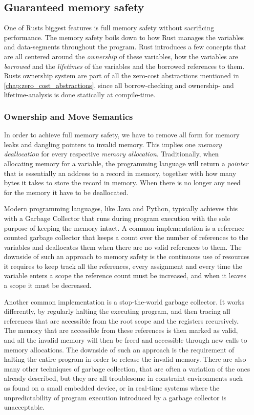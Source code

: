 \subsection{Guaranteed memory safety}

One of Rusts biggest features is full memory safety \cite{web:rust_book_unsafe} without sacrificing
performance. The memory safety boils down to how Rust manages the variables and data-segments
throughout the program. Rust introduces a few concepts that are all centered around the
\emph{ownership} of these variables, how the variables are \emph{borrowed} and the
\emph{lifetimes} of the variables and the borrowed references to them. Rusts ownership system are
part of all the zero-cost abstractions mentioned in \autoref{chap:zero_cost_abstractions}, since all
borrow-checking and ownership- and lifetime-analysis is done statically at compile-time.

\subsubsection{Ownership and Move Semantics} \hfill

In order to achieve full memory safety, we have to remove all form for memory leaks and dangling
pointers to invalid memory. This implies one \emph{memory deallocation} for every respective
\emph{memory allocation}. Traditionally, when allocating memory for a variable, the programming
language will return a \emph{pointer} that is essentially an address to a record in memory,
together with how many bytes it takes to store the record in memory. When there is no longer any
need for the memory it have to be deallocated.

Modern programming languages, like Java and Python, typically achieves this with a Garbage Collector
that runs during program execution with the sole purpose of keeping the memory intact. A common
implementation is a reference counted garbage collector that keeps a count over the number of
references to the variables and deallocates them when there are no valid references to them. The
downside of such an approach to memory safety is the continuous use of resources it requires to keep
track all the references, every assignment and every time the variable enters a scope the reference
count must be increased, and when it leaves a scope it must be decreased.

Another common implementation is a stop-the-world garbage collector. It works differently, by
regularly halting the executing program, and then tracing all references that are accessible from
the root scope and the registers recursively. The memory that are accessible from these references
is then marked as valid, and all the invalid memory will then be freed and accessible through new
calls to memory allocations. The downside of such an approach is the requirement of halting the
entire program in order to release the invalid memory. There are also many other techniques of
garbage collection, that are often a variation of the ones already described, but they are all
troublesome in constraint environments such as found on a small embedded device, or in real-time
systems where the unpredictability of program execution introduced by a garbage collector is
unacceptable.

